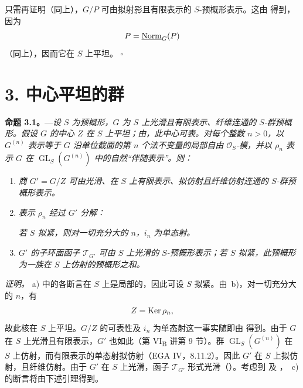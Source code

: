 只需再证明（同上），\(G/P\) 可由拟射影且有限表示的 \(S\)-预概形表示。这由  得到，因为
\[
  P=\underline{\operatorname{Norm}}_G(P)
\]
（同上），因而它在 \(S\) 上平坦。
\hfill\(\square\)

%
\section*{3. 中心平坦的群}

\noindent{}%
\textbf{命题 3.1。}---\textit{设 \(S\) 为预概形，\(G\) 为 \(S\) 上光滑且有限表示、纤维连通的 \(S\)-群预概形。假设 \(G\) 的中心 \(Z\) 在 \(S\) 上平坦；由，此中心可表。对每个整数 \(n>0\)，以 \(G^{(n)}\) 表示等于 \(G\) 沿单位截面的第 \(n\) 个法不变量的局部自由 \(\mathcal O_S\)-模，并以 \(\rho_n\) 表示 \(G\) 在 \(\operatorname{GL}_S(G^{(n)})\) 中的自然“伴随表示”。则：}
\begin{enumerate}
\renewcommand{\labelenumi}{\textit{\alph{enumi})}}
\item \textit{商 \(G'=G/Z\) 可由光滑、在 \(S\) 上有限表示、拟仿射且纤维仿射连通的 \(S\)-群预概形表示。}
\item \textit{表示 \(\rho_n\) 经过 \(G'\) 分解：}
\begin{center}
\end{center}
\textit{若 \(S\) 拟紧，则对一切充分大的 \(n\)，\(i_n\) 为单态射。}
\item \textit{\(G'\) 的子环面函子 \(\mathscr T_{G'}\) 可由 \(S\) 上光滑的 \(S\)-预概形表示；若 \(S\) 拟紧，此预概形为一族在 \(S\) 上仿射的预概形之和。}
\end{enumerate}

\medskip
\noindent\textit{证明。}
a) 中的各断言在 \(S\) 上是局部的，因此可设 \(S\) 拟紧。由~b)，对一切充分大的 \(n\)，有
\[
  Z=\operatorname{Ker}\rho_n,
\]
故此核在 \(S\) 上平坦。\(G/Z\) 的可表性及 \(i_n\) 为单态射这一事实随即由  得到。由于 \(G\) 在 \(S\) 上光滑且有限表示，\(G'\) 也如此（第 VI\textsubscript{B} 讲第 9 节）。群 \(\operatorname{GL}_S(G^{(n)})\) 在 \(S\) 上仿射，而有限表示的单态射拟仿射（EGA IV，8.11.2）。因此 \(G'\) 在 \(S\) 上拟仿射，且纤维仿射。由于 \(G'\) 在 \(S\) 上光滑，函子 \(\mathscr T_{G'}\) 形式光滑（）。考虑到 及 ，~c) 的断言将由下述引理得到。

